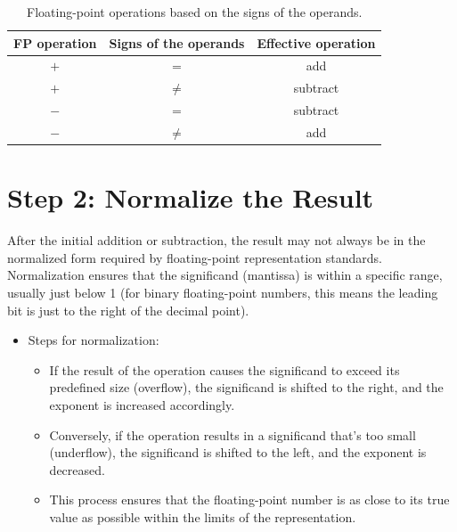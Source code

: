 \documentclass[12pt,openany]{book}
\begin{document}
			      	\begin{table}[h]
			      		\centering
			      		\caption*{Floating-point operations based on the signs of the operands.}
			      		\begin{tabular}{ccc}
			      			\toprule
			      			FP operation & Signs of the operands & Effective operation \\
			      			\midrule
			      			\(+\)        & \(=\)                 & add                 \\
			      			\(+\)        & \(\neq\)              & subtract            \\
			      			\(-\)        & \(=\)                 & subtract            \\
			      			\(-\)        & \(\neq\)              & add                 \\
			      			\bottomrule
			      		\end{tabular}
			      	\end{table}
			      	    
			      	\section*{Step 2: Normalize the Result}
			      	After the initial addition or subtraction, the result may not always be in the normalized form required by floating-point representation standards. Normalization ensures that the significand (mantissa) is within a specific range, usually just below 1 (for binary floating-point numbers, this means the leading bit is just to the right of the decimal point).
			      	    
			      	\begin{itemize}
			      		\item[] Steps for normalization:
			      		      \begin{itemize}
			      		      	\item If the result of the operation causes the significand to exceed its predefined size (overflow), the significand is shifted to the right, and the exponent is increased accordingly.
			      		      	\item Conversely, if the operation results in a significand that's too small (underflow), the significand is shifted to the left, and the exponent is decreased.
			      		      	\item This process ensures that the floating-point number is as close to its true value as possible within the limits of the representation.
			      		      \end{itemize}
			      	\end{itemize}
\end{document}

